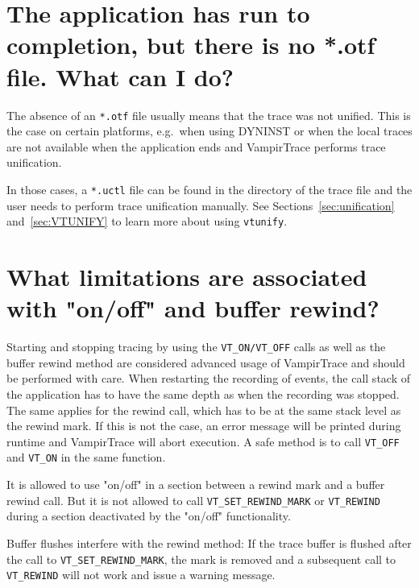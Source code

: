 \documentclass[a4paper,twoside,12pt,BCOR12mm]{scrbook}
\begin{document}
\begin{latexonly}
\section[There is no *.otf file. What can I do?]{The application has run to completion, but there is no *.otf file. What can I do?}

The absence of an \texttt{*.otf} file usually means that the trace was not unified. This
is the case on certain platforms, e.g.~when using DYNINST or when the local traces
are not available when the application ends and VampirTrace performs trace unification.

In those cases, a \texttt{*.uctl} file can be found in the directory of the trace file and the
user needs to perform trace unification manually. See Sections~\ref{sec:unification} and~\ref{sec:VTUNIFY}
to learn more about using \texttt{vtunify}.

\section{What limitations are associated with "on/off" and buffer rewind?}
\label{sec:faq_onoff}

Starting and stopping tracing by using the \texttt{VT\_ON/VT\_OFF} calls 
as well as the buffer rewind method are considered
advanced usage of VampirTrace and should be performed with care. When restarting
the recording of events, the call stack of the application has to have the same depth
as when the recording was stopped. The same applies for the rewind call, which
has to be at the same stack level as the rewind mark. If this is not the case, an error
message will be printed during runtime and VampirTrace will abort execution.
A safe method is to call \texttt{VT\_OFF} and \texttt{VT\_ON} in the same function.

It is allowed to use "on/off" in a section between a rewind mark and a buffer rewind call.
But it is not allowed to call \texttt{VT\_SET\_REWIND\_MARK} or \texttt{VT\_REWIND}
during a section deactivated by the "on/off" functionality.

Buffer flushes interfere with the rewind method: If the trace buffer is flushed
after the call to \texttt{VT\_SET\_REWIND\_MARK}, the mark is removed and a subsequent 
call to \texttt{VT\_REWIND} will not work and issue a warning message.


\end{latexonly}
\end{document}
